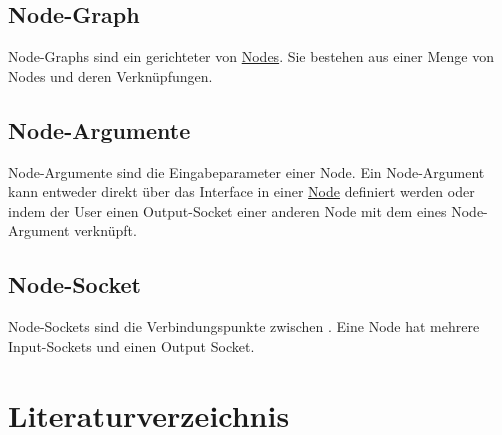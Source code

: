 \documentclass[ngerman]{article}
\begin{document}
\subsection{Node-Graph}
\label{sec:Node-Graph}
Node-Graphs sind ein gerichteter  von \hyperref[sec:Node]{Nodes}. Sie bestehen aus einer Menge von Nodes und deren Verknüpfungen. 

\subsection{Node-Argumente}
\label{sec:Node-Argumente}
Node-Argumente sind die Eingabeparameter einer Node. Ein Node-Argument kann entweder direkt über das Interface in einer \hyperref[sec:Node]{Node} definiert werden oder indem der User einen Output-Socket einer anderen Node mit dem  eines Node-Argument verknüpft.

\subsection{Node-Socket}
\label{sec:Node-Socket}
Node-Sockets sind die Verbindungspunkte zwischen . Eine Node hat mehrere Input-Sockets und einen Output Socket.


\pagebreak
\section{Literaturverzeichnis}

\printbibliography
\end{document}
